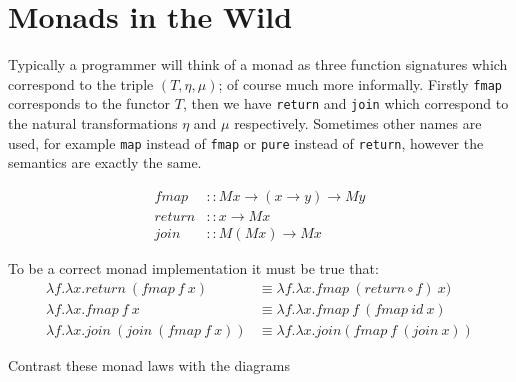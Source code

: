 \documentclass[a4paper,10pt]{article}
\theoremstyle{definition}
\begin{document}
\pagebreak
\section{Monads in the Wild}
Typically a programmer will think of a monad as three function signatures
which correspond to the triple $(T,\eta,\mu)$;
of course much more informally.
Firstly \texttt{fmap} corresponds to the functor $T$,
then we have \texttt{return} and \texttt{join} which correspond to
the natural transformations $\eta$ and $\mu$ respectively.
Sometimes other names are used,
for example \texttt{map} instead of \texttt{fmap}
or \texttt{pure} instead of \texttt{return},
however the semantics are exactly the same.

\begin{equation}
  \begin{split}
    fmap   &:: M x \rightarrow (x \rightarrow y) \rightarrow M y \\
    return &:: x \rightarrow M x                                 \\
    join   &:: M (M x) \rightarrow M x
  \end{split}
\end{equation}

To be a correct monad implementation it must be true that:
\begin{equation}
  \begin{split}
      \lambda f.\lambda x.return\ (fmap\ f\ x)
      &\equiv
      \lambda f.\lambda x.fmap\ (return \circ f)\ x)
      \\
      \lambda f.\lambda x.fmap\ f\ x
      &\equiv
      \lambda f.\lambda x.fmap\ f\ (fmap\ id\ x)
      \\
      \lambda f.\lambda x.join\ (join\ (fmap\ f\ x))
      &\equiv
      \lambda f.\lambda x.join(fmap\ f\ (join\ x))
  \end{split}
\end{equation}

Contrast these monad laws with the diagrams
\begin{center}
    \quad
\end{center}
\end{document}
